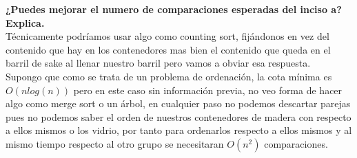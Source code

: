 \textbf{¿Puedes mejorar el numero de comparaciones esperadas del inciso a? Explica.}\\

Técnicamente podríamos usar algo como counting sort, fijándonos en vez del contenido que hay en los contenedores mas bien el contenido que queda en el barril de sake al llenar nuestro barril pero vamos a obviar esa respuesta.\\

Supongo que como se trata de un problema de ordenación, la cota mínima es $O(n log(n))$ pero en este caso sin información previa, no veo forma de hacer algo como merge sort o un árbol, en cualquier paso no podemos descartar parejas pues no podemos saber el orden de nuestros contenedores de madera con respecto a ellos mismos o los vidrio, por tanto para ordenarlos respecto a ellos mismos y al mismo tiempo respecto al otro grupo se necesitaran $O(n^2)$ comparaciones.